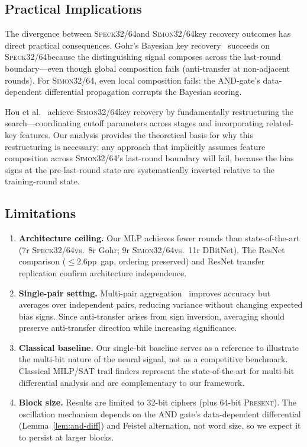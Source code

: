 \documentclass[runningheads]{llncs}
\newcommand{\speck}{\textsc{Speck32/64}}
\newcommand{\simon}{\textsc{Simon32/64}}
\newcommand{\present}{\textsc{Present}}
\newcommand{\pp}{pp}
\begin{document}
\subsection{Practical Implications}

The divergence between \speck and \simon key recovery outcomes has direct practical consequences.
Gohr's Bayesian key recovery~\cite{gohr2019} succeeds on \speck because the distinguishing signal composes across the last-round boundary---even though global composition fails (anti-transfer at non-adjacent rounds).
For \simon, even local composition fails: the AND-gate's data-dependent differential propagation corrupts the Bayesian scoring.

Hou et al.~\cite{hou2025bayesian} achieve \simon key recovery by fundamentally restructuring the search---coordinating cutoff parameters across stages and incorporating related-key features.
Our analysis provides the theoretical basis for why this restructuring is necessary: any approach that implicitly assumes feature composition across \simon's last-round boundary will fail, because the bias signs at the pre-last-round state are systematically inverted relative to the training-round state.

\subsection{Limitations}

\begin{enumerate}[leftmargin=*,itemsep=1pt]
  \item \textbf{Architecture ceiling.} Our MLP achieves fewer rounds than state-of-the-art (7r \speck vs.\ 8r Gohr; 9r \simon vs.\ 11r DBitNet).
  The ResNet comparison ($\leq$2.6\pp\ gap, ordering preserved) and ResNet transfer replication confirm architecture independence.
  \item \textbf{Single-pair setting.} Multi-pair aggregation~\cite{zhang2025multipair} improves accuracy but averages over independent pairs, reducing variance without changing expected bias signs.
  Since anti-transfer arises from sign inversion, averaging should preserve anti-transfer direction while increasing significance.
  \item \textbf{Classical baseline.} Our single-bit baseline serves as a reference to illustrate the multi-bit nature of the neural signal, not as a competitive benchmark.
  Classical MILP/SAT trail finders represent the state-of-the-art for multi-bit differential analysis and are complementary to our framework.
  \item \textbf{Block size.} Results are limited to 32-bit ciphers (plus 64-bit \present).
  The oscillation mechanism depends on the AND gate's data-dependent differential (Lemma~\ref{lem:and-diff}) and Feistel alternation, not word size, so we expect it to persist at larger blocks.
\end{enumerate}
\end{document}
